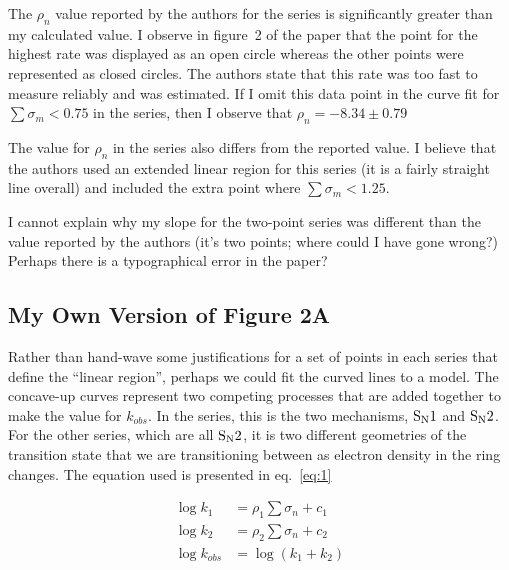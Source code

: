 \documentclass{tufte-handout}
\begin{document}
The $\rho_n$ value reported by the authors for the  series is significantly greater than my calculated value. I observe in figure~2 of the paper that the point for the highest rate was displayed as an open circle whereas the other points were represented as closed circles. The authors state that this rate was too fast to measure reliably and was estimated. If I omit this data point in the curve fit for $\sum \sigma_m < 0.75$ in the  series, then I observe that $\rho_n = -8.34 \pm 0.79$ 

The value for $\rho_n$ in the  series also differs from the reported value. I believe that the authors used an extended linear region for this series (it is a fairly straight line overall) and included the extra point where $\sum \sigma_m < 1.25$.

I cannot explain why my slope for the two-point  series was different than the value reported by the authors (it's two points; where could I have gone wrong?) Perhaps there is a typographical error in the paper?

\subsection{My Own Version of Figure 2A}

Rather than hand-wave some justifications for a set of points in each series that define the ``linear region'', perhaps we could fit the curved lines to a model. The concave-up curves represent two competing processes that are added together to make the value for $k_{obs}$. In the  series, this is the two mechanisms, $\rm S_N1$ and $\rm S_N2$. For the other series, which are all $\rm S_N2$, it is two different geometries of the transition state that we are transitioning between as electron density in the ring changes. The equation used is presented in eq.~\ref{eq:1}

\begin{equation}
\begin{split}
\log{k_1} &= \rho_1 \sum \sigma_n + c_1 \\
\log{k_2} &= \rho_2 \sum \sigma_n + c_2 \\
\log{k_{obs}} &= \log\left(k_1 + k_2\right)
\label{eq:1}
\end{split}
\end{equation}
\end{document}
